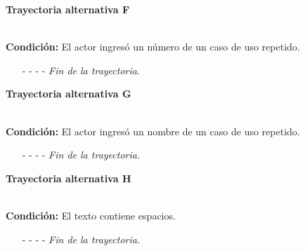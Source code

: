 \hypertarget{CU12-1:TAF}{\textbf{Trayectoria alternativa F}}\\
\noindent \textbf{Condición:} El actor ingresó un número de un caso de uso repetido.
\begin{enumerate}
	\UCpaso[\UCsist] Muestra el mensaje  señalando el campo que presenta la duplicidad en la pantalla .
	\UCpaso Regresa al paso \ref{CU12.1-P12} de la trayectoria principal.
	\item[- -] - - {\em {Fin de la trayectoria}}.
\end{enumerate}
\hypertarget{CU12-1:TAG}{\textbf{Trayectoria alternativa G}}\\
\noindent \textbf{Condición:} El actor ingresó un nombre de un caso de uso repetido.
\begin{enumerate}
	\UCpaso[\UCsist] Muestra el mensaje  señalando el campo que presenta la duplicidad en la pantalla .
	\UCpaso Regresa al paso \ref{CU12.1-P12} de la trayectoria principal.
	\item[- -] - - {\em {Fin de la trayectoria}}.
\end{enumerate}
\hypertarget{CU12-1:TAH}{\textbf{Trayectoria alternativa H}}\\
\noindent \textbf{Condición:} El texto contiene espacios.
\begin{enumerate}
	\UCpaso[\UCsist] Sustituye los espacios por guiones bajos.
	\UCpaso Continua en el \ref{CU12.1-TA1} de la trayectoria alternativa A.
	\item[- -] - - {\em {Fin de la trayectoria}}.
\end{enumerate}

